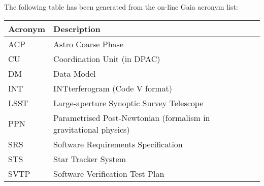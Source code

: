 The following table has been generated from the on-line Gaia acronym list:
\newline\newline%
\addtocounter{table}{-1}
\begin{longtable}{|l|p{}|}\hline
\textbf{Acronym} & \textbf{Description}  \\\hline
ACP&Astro Coarse Phase \\\hline
CU&Coordination Unit (in DPAC) \\\hline
DM&Data Model \\\hline
INT&INTterferogram (Code V format) \\\hline
LSST&Large-aperture Synoptic Survey Telescope \\\hline
PPN&Parametrised Post-Newtonian (formalism in gravitational physics) \\\hline
SRS&Software Requirements Specification \\\hline
STS&Star Tracker System \\\hline
SVTP&Software Verification Test Plan \\\hline
\end{longtable}
